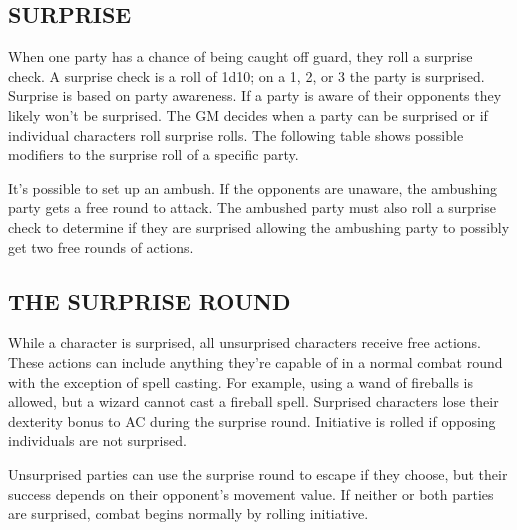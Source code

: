 \begin{multicols}{2}

\section{SURPRISE}

When one party has a chance of being caught off guard, they roll a surprise check.  A surprise check is a roll of 1d10; on a 1, 2, or 3 the party is surprised.  Surprise is based on party awareness.  If a party is aware of their opponents they likely won't be surprised.  The GM decides when a party can be surprised or if individual characters roll surprise rolls.  The following table shows possible modifiers to the surprise roll of a specific party.

It's possible to set up an ambush.  If the opponents are unaware, the ambushing party gets a free round to attack.  The ambushed party must also roll a surprise check to determine if they are surprised allowing the ambushing party to possibly get two free rounds of actions.
 
\subsection{THE SURPRISE ROUND}

While a character is surprised, all unsurprised characters receive free actions.  These actions can include anything they're capable of in a normal combat round with the exception of spell casting.  For example, using a wand of fireballs is allowed, but a wizard cannot cast a fireball spell.  Surprised characters lose their dexterity bonus to AC during the surprise round.  Initiative is rolled if opposing individuals are not surprised.

Unsurprised parties can use the surprise round to escape if they choose, but their success depends on their opponent's movement value.  If neither or both parties are surprised, combat begins normally by rolling initiative.

\noindent
\begin{minipage}{\columnwidth}


\end{minipage}
\end{multicols}
